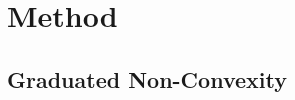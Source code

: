\section{Method}\label{sec:2-pose-estimation-method}









\subsection{Graduated Non-Convexity}\label{subs:2-pose-estimation-graduated-non-convexity}

